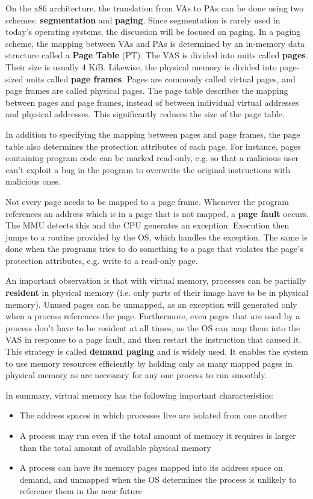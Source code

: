 \documentclass[shortabstract, english]{iithesis}
\begin{document}
On the x86 architecture, the translation from VAs to PAs can be done using two
schemes: \textbf{segmentation} and \textbf{paging}. Since segmentation is rarely
used in today's operating systems, the discussion will be focused on paging. In
a paging scheme, the mapping between VAs and PAs is determined by an in-memory
data structure called a \textbf{Page Table} (PT). The VAS is divided into units
called \textbf{pages}. Their size is usually 4 KiB. Likewise, the physical
memory is divided into page-sized units called \textbf{page frames}. Pages are
commonly called virtual pages, and page frames are called physical pages. The
page table describes the mapping between pages and page frames, instead of
between individual virtual addresses and physical addresses. This significantly
reduces the size of the page table.

In addition to specifying the mapping between pages and page frames, the page
table also determines the protection attributes of each page. For instance,
pages containing program code can be marked read-only, e.g. so that a malicious
user can't exploit a bug in the program to overwrite the original instructions
with malicious ones.

Not every page needs to be mapped to a page frame. Whenever the program
references an address which is in a page that is not mapped, a \textbf{page
  fault} occurs. The MMU detects this and the CPU generates an exception.
Execution then jumps to a routine provided by the OS, which handles the
exception. The same is done when the programs tries to do something to a page
that violates the page's protection attributes, e.g. write to a read-only page.

An important observation is that with virtual memory, processes can be partially
\textbf{resident} in physical memory (i.e. only parts of their image have to be
in physical memory). Unused pages can be unmapped, as an exception will
generated only when a process references the page. Furthermore, even pages that
are used by a process don't have to be resident at all times, as the OS can map
them into the VAS in response to a page fault, and then restart the instruction
that caused it. This strategy is called \textbf{demand paging} and is widely
used. It enables the system to use memory resources efficiently by holding only
as many mapped pages in physical memory as are necessary for any one process to
run smoothly.

In summary, virtual memory has the following important characteristics:
\begin{itemize}
\item The address spaces in which processes live are isolated from one another
\item A process may run even if the total amount of memory it requires is larger
  than the total amount of available physical memory
\item A process can have its memory pages mapped into its address space on
  demand, and unmapped when the OS determines the process is unlikely to
  reference them in the near future
\end{itemize}
\end{document}
